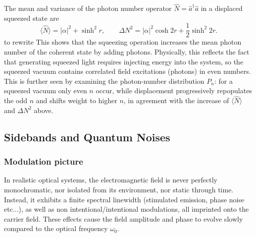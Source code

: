 The mean and variance of the photon number operator $\hat N = \hat a^\dagger \hat a$ in a displaced squeezed state are
\begin{equation}
\langle \hat N \rangle = |\alpha|^2 + \sinh^2 r,
\qquad
\Delta N^2 = |\alpha|^2 \cosh 2r + \frac{1}{2} \sinh^2 2r.
\label{II.xx8}
\end{equation}
\color{red}
to rewrite
\color{black}
This shows that the squeezing operation increases the mean photon number of the coherent state by adding photons. Physically, this reflects the fact that generating squeezed light requires injecting energy into the system, so the squeezed vacuum contains correlated field excitations (photons) in even numbers. This is further seen by examining the photon-number distribution $P_n$: for a squeezed vacuum only even $n$ occur, while displacement progressively repopulates the odd $n$ and shifts weight to higher $n$, in agreement with the increase of $\langle \hat{N} \rangle$ and $\Delta N^2$ above.



\color{black}

\subsection{Sidebands and Quantum Noises}

\subsubsection{Modulation picture}
In realistic optical systems, the electromagnetic field is never perfectly monochromatic, nor isolated from its environment, nor static through time. Instead, it exhibits a finite spectral linewidth (stimulated emission, phase noise etc...), as well as non intentional/intentional modulations, all imprinted onto the carrier field. These effects cause the field amplitude and phase to evolve slowly compared to the optical frequency $\omega_0$. \\

